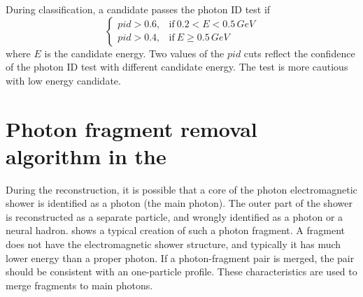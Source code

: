 During classification, a candidate passes the photon ID test if
\begin{equation}
\begin{cases}
  pid > 0.6, & \text{if}\ 0.2 < E < 0.5\,GeV\\
  pid > 0.4, & \text{if}\ E \geqslant 0.5\,GeV
\end{cases}
\end{equation}
where $E$ is the candidate energy. Two values of the $pid$ cuts reflect the confidence of the photon ID test with different candidate energy. The test is more cautious with low energy candidate.


\section{Photon fragment removal algorithm in the \ECAL}
\label{sec:photonFragRemoval}
During the reconstruction, it is possible that a core of the photon electromagnetic shower is identified as a photon (the main photon). The outer part of the shower is reconstructed as a separate particle, and wrongly identified as a photon or a neural hadron.  shows a typical creation of such a photon fragment. A fragment does not have the electromagnetic shower structure, and typically it has much lower energy than a proper photon. If a photon-fragment pair is merged, the pair should be consistent with an one-particle profile. These characteristics are used to merge fragments to main photons.


